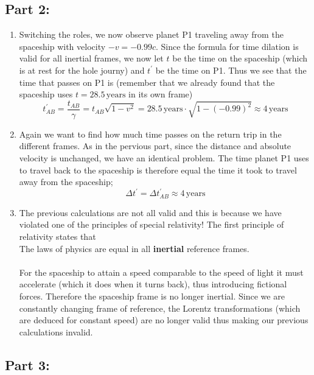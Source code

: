 \documentclass[a4paper,10pt,english]{article}
\begin{document}
\subsection*{Part 2:}

\begin{enumerate}
\item Switching the roles, we now observe planet P1 traveling away from the spaceship with velocity $-v=-0.99c$. Since the formula for time dilation is valid for all inertial frames, we now let $t$ be the time on the spaceship (which is at rest for the hole journy) and $t^{\prime}$ be the time on P1. Thus we see that the time that passes on P1 is (remember that we already found that the spaceship uses $t=28.5\,\text{years}$ in its own frame) 
\[
t^{\prime}_{AB}=\frac{t_{AB}}{\gamma}=t_{AB}\sqrt{1-v^2}=28.5\,\text{years}\cdot\sqrt{1-(-0.99)^2}\approx4\,\text{years}
\]
\item Again we want to find how much time passes on the return trip in the different frames. As in the pervious part, since the distance and absolute velocity is unchanged, we have an identical problem. The time planet P1 uses to travel back to the spaceship is therefore equal the time it took to travel away from the spaceship; 
\[
\Delta t^{\prime}=\Delta t^{\prime}_{AB}\approx4\,\text{years}
\]
\item The previous calculations are not all valid and this is because we have violated one of the\begingroup
\setlength\parindent{24pt} 
principles of special relativity! The first principle of relativity states that\\

The laws of physics are equal in all \textbf{inertial} reference frames.\\ \\
For the spaceship to attain a speed comparable to the speed of light it must accelerate (which it does when it turns back), thus introducing fictional forces. Therefore the spaceship frame is no longer inertial. Since we are constantly changing frame of reference, the Lorentz transformations (which are deduced for constant speed) are no longer valid thus making our previous calculations invalid.
\endgroup
\end{enumerate}

\subsection*{Part 3:}
\end{document}
